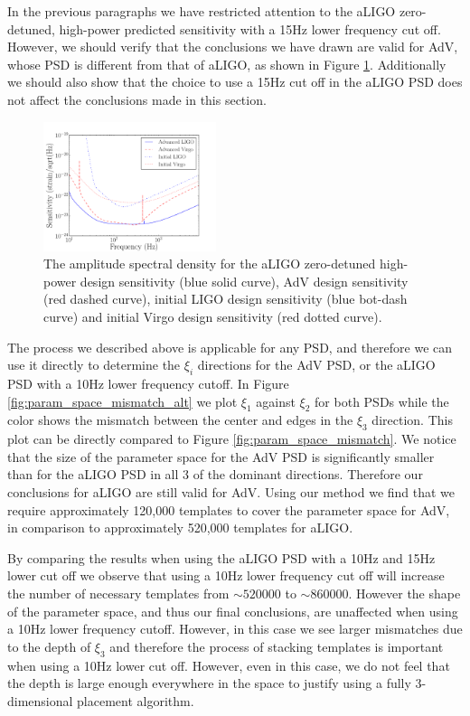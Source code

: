 In the previous paragraphs we have restricted attention to the aLIGO
zero-detuned, high-power predicted sensitivity with a 15Hz lower frequency cut off. However,
we should verify that the conclusions we have drawn are valid for AdV, whose
PSD is different from that of aLIGO, as shown in Figure \ref{fig:asd_comparison}. Additionally we
should also show that the choice to use a 15Hz cut off in the aLIGO PSD does not affect
the conclusions made in this section. 
\begin{figure}
\begin{center}
\includegraphics[width=0.45\textwidth]{papers/bns_spin/figure6.pdf}
\end{center}
\caption{\label{fig:asd_comparison} The amplitude spectral density for the aLIGO
zero-detuned high-power design sensitivity (blue solid curve), AdV design sensitivity
(red dashed curve), initial LIGO design sensitivity (blue bot-dash curve) and initial
Virgo design sensitivity (red dotted curve).}
\end{figure}


The process we described above is applicable for any PSD, and therefore we can use it directly
to determine the $\xi_i$ directions for the AdV PSD, or the aLIGO PSD with
a 10Hz lower frequency cutoff. In Figure \ref{fig:param_space_mismatch_alt} we plot
$\xi_1$ against $\xi_2$ for both PSDs while the color shows the mismatch between the center and edges in
the $\xi_3$ direction. This plot can be directly compared to Figure \ref{fig:param_space_mismatch}. We notice
that the size of the parameter space for the AdV PSD is significantly smaller than for the
aLIGO PSD in all 3 of the dominant directions. Therefore our conclusions for aLIGO are still
valid for AdV. Using our method we find that we require approximately 120,000 templates to cover the
parameter space for AdV, in comparison to approximately 520,000 templates for aLIGO. 

By comparing the results when using the aLIGO PSD with a 10Hz and 15Hz lower cut off we observe
that using a 10Hz lower frequency cut off will increase the number of necessary templates from $\sim520000$
to $\sim860000$. However the
shape of the parameter space, and thus our final conclusions, are unaffected when using a 10Hz lower
frequency cutoff. However, in this case we see larger mismatches due to the depth of $\xi_3$ and
therefore the process of stacking templates is important when using a 10Hz lower cut off. However, even
in this case, we do
not feel that the depth is large enough everywhere in the space to justify using a fully 3-dimensional placement
algorithm.

